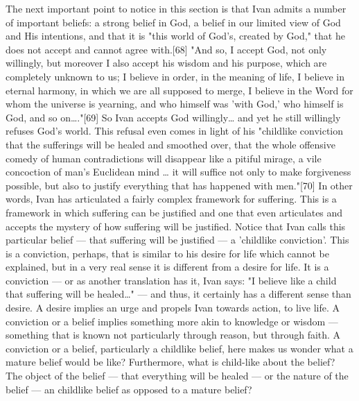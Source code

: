 The next important point to notice in this section is that Ivan admits a number of important beliefs: a strong belief in God, a belief in our limited view of God and His intentions, and that it is "this world of God's, created by God," that he does not accept and cannot agree with.[68] 
"And so, I accept God, not only willingly, but moreover I also accept his wisdom and his purpose, which are completely unknown to us; I believe in order, in the meaning of life, I believe in eternal harmony, in which we are all supposed to merge, I believe in the Word for whom the universe is yearning, and who himself was 'with God,' who himself is God, and so on…."[69] 
So Ivan accepts God willingly… and yet he still willingly refuses God's world. This refusal even comes in light of his "childlike conviction that the sufferings will be healed and smoothed over, that the whole offensive comedy of human contradictions will disappear like a pitiful mirage, a vile concoction of man's Euclidean mind … it will suffice not only to make forgiveness possible, but also to justify everything that has happened with men."[70] In other words, Ivan has articulated a fairly complex framework for suffering. This is a framework in which suffering can be justified and one that even articulates and accepts the mystery of how suffering will be justified.
Notice that Ivan calls this particular belief — that suffering will be justified — a 'childlike conviction'. This is a conviction, perhaps, that is similar to his desire for life which cannot be explained, but in a very real sense it is different from a desire for life. It is a conviction — or as another translation has it, Ivan says: "I believe like a child that suffering will be healed…" — and thus, it certainly has a different sense than desire. A desire implies an urge and propels Ivan towards action, to live life. A conviction or a belief implies something more akin to knowledge or wisdom — something that is known not particularly through reason, but through faith. A conviction or a belief, particularly a childlike belief, here makes us wonder what a mature belief would be like? Furthermore, what is child-like about the belief? The object of the belief — that everything will be healed — or the nature of the belief — an childlike belief as opposed to a mature belief?
